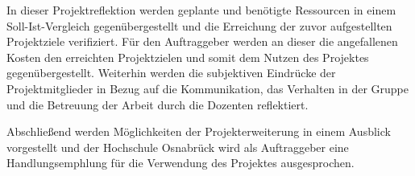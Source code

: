 In dieser Projektreflektion werden geplante und benötigte
Ressourcen in einem Soll-Ist-Vergleich gegenübergestellt und die Erreichung der zuvor
aufgestellten Projektziele verifiziert. Für den Auftraggeber werden an dieser die
angefallenen Kosten den erreichten Projektzielen und somit dem Nutzen des
Projektes gegenübergestellt. Weiterhin werden die subjektiven Eindrücke der
Projektmitglieder in Bezug auf die Kommunikation, das Verhalten in der Gruppe
und die Betreuung der Arbeit durch die Dozenten reflektiert.

Abschließend werden Möglichkeiten der Projekterweiterung in einem Ausblick vorgestellt
und der Hochschule Osnabrück wird als Auftraggeber eine Handlungsemphlung für
die Verwendung des Projektes ausgesprochen.